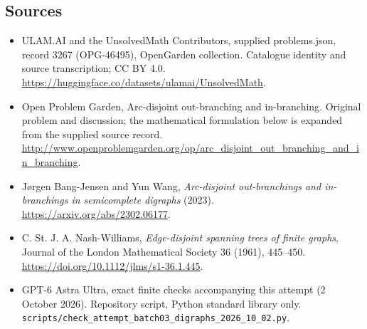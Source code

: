 \documentclass[11pt,a4paper]{article}
\begin{document}
\subsection{Sources}
\begin{itemize}
\item[S1] ULAM.AI and the UnsolvedMath Contributors, supplied problems.json, record 3267 (OPG-46495), OpenGarden collection. Catalogue identity and source transcription; CC BY 4.0.
\url{https://huggingface.co/datasets/ulamai/UnsolvedMath}.
\item[S2] Open Problem Garden, Arc-disjoint out-branching and in-branching. Original problem and discussion; the mathematical formulation below is expanded from the supplied source record.
\url{http://www.openproblemgarden.org/op/arc_disjoint_out_branching_and_in_branching}.
\item[S3] J\o rgen Bang-Jensen and Yun Wang, \emph{Arc-disjoint out-branchings and in-branchings in semicomplete digraphs} (2023). \url{https://arxiv.org/abs/2302.06177}.
\item[S4] C. St. J. A. Nash-Williams, \emph{Edge-disjoint spanning trees of finite graphs}, Journal of the London Mathematical Society 36 (1961), 445--450. \url{https://doi.org/10.1112/jlms/s1-36.1.445}.
\item[S9] GPT-6 Astra Ultra, exact finite checks accompanying this attempt (2 October 2026). Repository script, Python standard library only. \texttt{scripts/check\_attempt\_batch03\_digraphs\_2026\_10\_02.py}.
\end{itemize}
\end{document}
